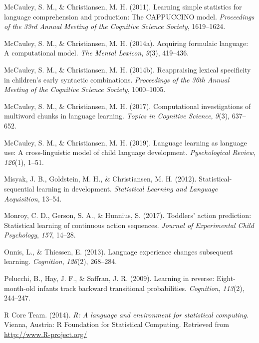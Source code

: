 \documentclass[man,mask,floatsintext]{apa6}
\theoremstyle{definition}
\theoremstyle{definition}
\theoremstyle{definition}
\theoremstyle{remark}
\begin{document}
\hypertarget{ref-mccauley2011learning}{}
McCauley, S. M., \& Christiansen, M. H. (2011). Learning simple
statistics for language comprehension and production: The CAPPUCCINO
model. \emph{Proceedings of the 33rd Annual Meeting of the Cognitive
Science Society}, 1619--1624.

\hypertarget{ref-mccauley2014acquiring}{}
McCauley, S. M., \& Christiansen, M. H. (2014a). Acquiring formulaic
language: A computational model. \emph{The Mental Lexicon}, \emph{9}(3),
419--436.

\hypertarget{ref-mccauley2014reappraising}{}
McCauley, S. M., \& Christiansen, M. H. (2014b). Reappraising lexical
specificity in children's early syntactic combinations.
\emph{Proceedings of the 36th Annual Meeting of the Cognitive Science
Society}, 1000--1005.

\hypertarget{ref-mccauley2017computational}{}
McCauley, S. M., \& Christiansen, M. H. (2017). Computational
investigations of multiword chunks in language learning. \emph{Topics in
Cognitive Science}, \emph{9}(3), 637--652.

\hypertarget{ref-mccauley2019languagelearning}{}
McCauley, S. M., \& Christiansen, M. H. (2019). Language learning as
language use: A cross-linguistic model of child language development.
\emph{Pyschological Review}, \emph{126}(1), 1--51.

\hypertarget{ref-misyak2012statistical}{}
Misyak, J. B., Goldstein, M. H., \& Christiansen, M. H. (2012).
Statistical-sequential learning in development. \emph{Statistical
Learning and Language Acquisition}, 13--54.

\hypertarget{ref-monroy2017toddlers}{}
Monroy, C. D., Gerson, S. A., \& Hunnius, S. (2017). Toddlers' action
prediction: Statistical learning of continuous action sequences.
\emph{Journal of Experimental Child Psychology}, \emph{157}, 14--28.

\hypertarget{ref-onnis2013language}{}
Onnis, L., \& Thiessen, E. (2013). Language experience changes
subsequent learning. \emph{Cognition}, \emph{126}(2), 268--284.

\hypertarget{ref-pelucchi2009learning}{}
Pelucchi, B., Hay, J. F., \& Saffran, J. R. (2009). Learning in reverse:
Eight-month-old infants track backward transitional probabilities.
\emph{Cognition}, \emph{113}(2), 244--247.

\hypertarget{ref-R}{}
R Core Team. (2014). \emph{R: A language and environment for statistical
computing}. Vienna, Austria: R Foundation for Statistical Computing.
Retrieved from \url{http://www.R-project.org/}
\end{document}
